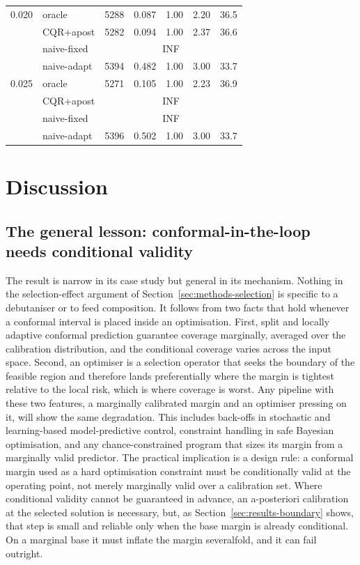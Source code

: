 \documentclass[review,times]{elsarticle}
\begin{document}
\begin{table}[t]
\begin{tabular}{llrrrrr}
\midrule
0.020 & oracle      & 5288 & 0.087 & 1.00 & 2.20 & 36.5 \\
      & CQR+apost   & 5282 & 0.094 & 1.00 & 2.37 & 36.6 \\
      & naive-fixed & \multicolumn{5}{c}{INF} \\
      & naive-adapt & 5394 & 0.482 & 1.00 & 3.00 & 33.7 \\
\midrule
0.025 & oracle      & 5271 & 0.105 & 1.00 & 2.23 & 36.9 \\
      & CQR+apost   & \multicolumn{5}{c}{INF} \\
      & naive-fixed & \multicolumn{5}{c}{INF} \\
      & naive-adapt & 5396 & 0.502 & 1.00 & 3.00 & 33.7 \\
\bottomrule
\end{tabular}
\end{table}

\section{Discussion}
\label{sec:discussion}

\subsection{The general lesson: conformal-in-the-loop needs conditional validity}

The result is narrow in its case study but general in its mechanism. Nothing in the
selection-effect argument of Section~\ref{sec:methods-selection} is specific to a debutaniser or
to feed composition. It follows from two facts that hold whenever a conformal interval is placed
inside an optimisation. First, split and locally adaptive conformal prediction guarantee
coverage marginally, averaged over the calibration distribution, and the conditional coverage
varies across the input space. Second, an optimiser is a selection operator that seeks the
boundary of the feasible region and therefore lands preferentially where the margin is tightest
relative to the local risk, which is where coverage is worst. Any pipeline with these two
features, a marginally calibrated margin and an optimiser pressing on it, will show the same
degradation. This includes back-offs in stochastic and learning-based model-predictive control,
constraint handling in safe Bayesian optimisation, and any chance-constrained program that sizes
its margin from a marginally valid predictor. The practical implication is a design rule: a
conformal margin used as a hard optimisation constraint must be conditionally valid at the
operating point, not merely marginally valid over a calibration set. Where conditional validity
cannot be guaranteed in advance, an a-posteriori calibration at the selected solution
\citep{zhao2024cpp} is necessary, but, as Section~\ref{sec:results-boundary} shows, that step is
small and reliable only when the base margin is already conditional. On a marginal base it must
inflate the margin severalfold, and it can fail outright.
\end{document}
